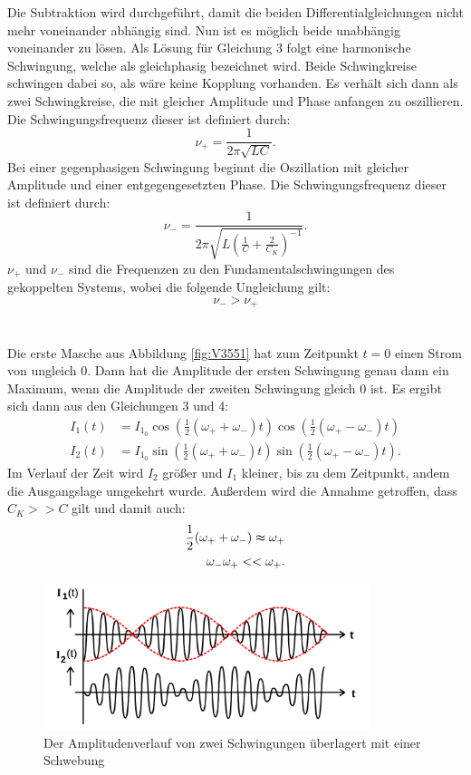 \documentclass[
  bibliography=totoc,     %
  captions=tableheading,  %
  titlepage=firstiscover, %
]{scrartcl}
\begin{document}
Die Subtraktion wird durchgeführt, damit die beiden Differentialgleichungen nicht
mehr voneinander abhängig sind. Nun ist es möglich beide unabhängig voneinander
zu lösen. Als Lösung für Gleichung 3 folgt eine harmonische Schwingung, welche
als gleichphasig bezeichnet wird. Beide Schwingkreise schwingen dabei so, als
wäre keine Kopplung vorhanden. Es verhält sich dann als zwei Schwingkreise, die
mit gleicher Amplitude und Phase anfangen zu oszillieren. Die
Schwingungsfrequenz dieser ist definiert durch:
\begin{equation}
  \nu_+=\frac{1}{2\pi\sqrt{LC}}.
\end{equation}
Bei einer gegenphasigen Schwingung beginnt die Oszillation mit gleicher
Amplitude und einer entgegengesetzten Phase. Die Schwingungsfrequenz dieser
ist definiert durch:
\begin{equation}
  \nu_-=\frac{1}{2\pi\sqrt{L(\frac{1}{C}+\frac{2}{C_K})^{-1}}}.
\end{equation}
$\nu_+$ und $\nu_-$ sind die Frequenzen zu den Fundamentalschwingungen des
gekoppelten Systems, wobei die folgende Ungleichung gilt:
\begin{equation}
  \nu_->\nu_+
\end{equation} \\
\\
Die erste Masche aus Abbildung \ref{fig:V3551} hat zum Zeitpunkt $t=0$ einen
Strom von ungleich 0. Dann hat die Amplitude der ersten Schwingung genau dann
ein Maximum, wenn die Amplitude der zweiten Schwingung gleich 0 ist. Es
ergibt sich dann aus den Gleichungen 3 und 4:
\begin{align}
  I_1(t) &=I_{1_0}\cos(\frac{1}{2}(\omega_++\omega_-)t)\cos(\frac{1}{2}(\omega_+-\omega_-)t) \\
  I_2(t) &=I_{1_0}\sin(\frac{1}{2}(\omega_++\omega_-)t)\sin(\frac{1}{2}(\omega_+-\omega_-)t).
\end{align}
Im Verlauf der Zeit wird $I_2$ größer und $I_1$ kleiner, bis zu dem Zeitpunkt, andem
die Ausgangslage umgekehrt wurde. Außerdem wird die Annahme getroffen, dass
$C_K>>C$ gilt und damit auch:
\begin{align}
  \frac{1}{2}(\omega_++\omega_-)\thickapprox\omega_+ \\
  \omega_-\omega_+<<\omega_+.
\end{align}
\begin{figure}[htb]
  \centering
  \includegraphics[width=0.85\textwidth]{V3552.png}
  \caption{Der Amplitudenverlauf von zwei Schwingungen überlagert mit einer Schwebung}
  \label{fig:V3552}
\end{figure}
\end{document}
